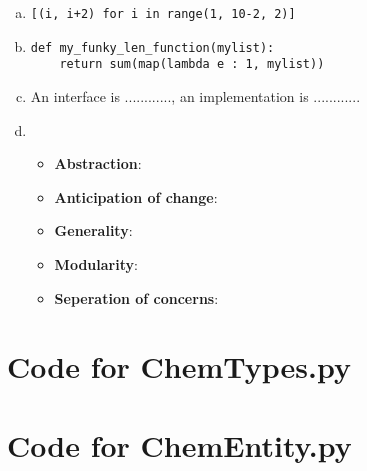 \documentclass[12pt]{article}
\begin{document}
\begin{enumerate}[a)]
\item
\begin{lstlisting}
[(i, i+2) for i in range(1, 10-2, 2)]
\end{lstlisting}

\item
\begin{lstlisting}
def my_funky_len_function(mylist):
    return sum(map(lambda e : 1, mylist))
\end{lstlisting}

\item An interface is ............, an implementation is ............

\item
\begin{itemize}[\label{}]
    \item \textbf{Abstraction}:
    \item \textbf{Anticipation of change}:
    \item \textbf{Generality}:
    \item \textbf{Modularity}:
    \item \textbf{Seperation of concerns}:
\end{itemize}

\end{enumerate}


\newpage

\lstset{language=Python, basicstyle=\tiny, breaklines=true, showspaces=false,
  showstringspaces=false, breakatwhitespace=true}

\def\thesection{\Alph{section}}

\section{Code for ChemTypes.py}

\noindent 

\newpage

\section{Code for ChemEntity.py}

\noindent 

\newpage
\end{document}
